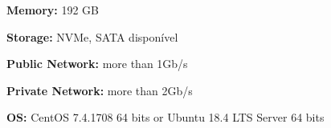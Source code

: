 \textbf{Memory:} 192 GB

\textbf{Storage:} NVMe, SATA disponível

\textbf{Public Network:} more than 1Gb/s

\textbf{Private Network:} more than 2Gb/s

\textbf{OS:} CentOS 7.4.1708 64 bits or Ubuntu 18.4 LTS Server 64 bits



% 
% 
% 
% 



